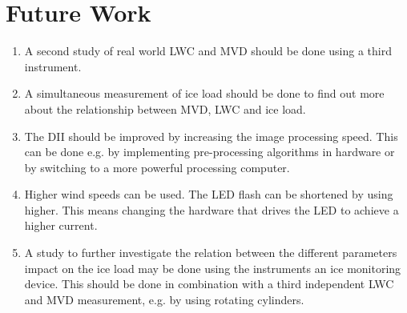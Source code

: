 \section{Future Work}

\begin{enumerate}
\item
A second study of real world LWC and MVD should be done using a third instrument. 

\item
A simultaneous measurement of ice load should be done to find out more about the relationship between MVD, LWC and ice load.

\item
The DII should be improved by increasing the image processing speed. This can be done e.g. by implementing pre-processing algorithms in hardware or by switching to a more powerful processing computer.

\item
Higher wind speeds can be used. The LED flash can be shortened by using higher. This means changing the hardware that drives the LED to achieve a higher current.

\item
A study to further investigate the relation between the different parameters impact on the ice load may be done using the instruments an ice monitoring device. This should be done in combination with a third independent LWC and MVD measurement, e.g. by using rotating cylinders\cite{makk1992}.

\end{enumerate}
